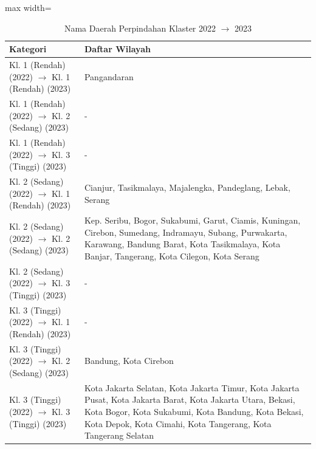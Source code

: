 \begin{table}[H]
\centering
\caption{Nama Daerah Perpindahan Klaster 2022 \(\rightarrow\) 2023} \label{tab:apptransname2022x2023}
\begin{adjustbox}{max width=\textwidth}
\begin{tabular}{|p{4cm}|p{10cm}|}
\hline
\textbf{Kategori} & \textbf{Daftar Wilayah} \\
\hline
Kl. 1 (Rendah) (2022) \(\rightarrow\) Kl. 1 (Rendah) (2023) & Pangandaran \\
\hline
Kl. 1 (Rendah) (2022) \(\rightarrow\) Kl. 2 (Sedang) (2023) & - \\
\hline
Kl. 1 (Rendah) (2022) \(\rightarrow\) Kl. 3 (Tinggi) (2023) & - \\
\hline
Kl. 2 (Sedang) (2022) \(\rightarrow\) Kl. 1 (Rendah) (2023) & Cianjur, Tasikmalaya, Majalengka, Pandeglang, Lebak, Serang \\
\hline
Kl. 2 (Sedang) (2022) \(\rightarrow\) Kl. 2 (Sedang) (2023) & Kep. Seribu, Bogor, Sukabumi, Garut, Ciamis, Kuningan, Cirebon, Sumedang, Indramayu, Subang, Purwakarta, Karawang, Bandung Barat, Kota Tasikmalaya, Kota Banjar, Tangerang, Kota Cilegon, Kota Serang \\
\hline
Kl. 2 (Sedang) (2022) \(\rightarrow\) Kl. 3 (Tinggi) (2023) & - \\
\hline
Kl. 3 (Tinggi) (2022) \(\rightarrow\) Kl. 1 (Rendah) (2023) & - \\
\hline
Kl. 3 (Tinggi) (2022) \(\rightarrow\) Kl. 2 (Sedang) (2023) & Bandung, Kota Cirebon \\
\hline
Kl. 3 (Tinggi) (2022) \(\rightarrow\) Kl. 3 (Tinggi) (2023) & Kota Jakarta Selatan, Kota Jakarta Timur, Kota Jakarta Pusat, Kota Jakarta Barat, Kota Jakarta Utara, Bekasi, Kota Bogor, Kota Sukabumi, Kota Bandung, Kota Bekasi, Kota Depok, Kota Cimahi, Kota Tangerang, Kota Tangerang Selatan \\
\hline
\end{tabular}
\end{adjustbox}
\end{table}